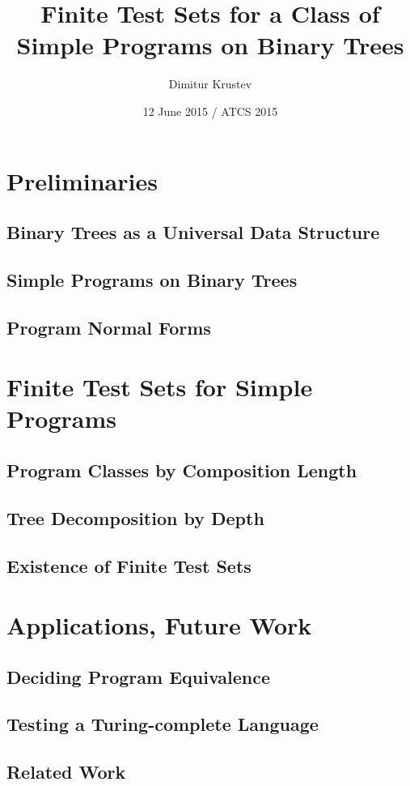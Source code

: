 \documentclass{beamer}
\title{Finite Test Sets for a Class of Simple Programs on Binary Trees}
\author{Dimitur Krustev}
\institute[IGE+XAO Balkan]
{
  IGE+XAO Balkan \\ \vspace{0.3cm} \pgfuseimage{mylogo1}
}
\date[ATCS 2015]{12 June 2015 / ATCS 2015}
\begin{document}
\begin{frame}
\maketitle
\end{frame}

\begin{frame}[Outline]
  \tableofcontents
\end{frame}

\section{Preliminaries}

\subsection{Binary Trees as a Universal Data Structure}

\begin{frame}

\end{frame}

\subsection{Simple Programs on Binary Trees}

\subsection{Program Normal Forms}

\section{Finite Test Sets for Simple Programs}

\subsection{Program Classes by Composition Length}

\subsection{Tree Decomposition by Depth}

\subsection{Existence of Finite Test Sets}

\section{Applications, Future Work}

\subsection{Deciding Program Equivalence}

\subsection{Testing a Turing-complete Language}

\subsection{Related Work} %
\end{document}
